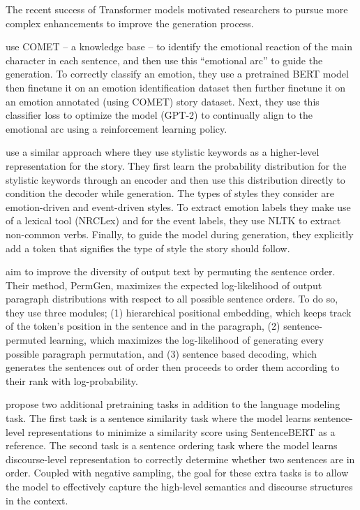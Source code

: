 The recent success of Transformer models motivated researchers to pursue more complex enhancements to improve the generation process.

\citep{brahman2020modeling} use COMET -- a knowledge base -- to identify the emotional reaction of the main character in each sentence, and then use this ``emotional arc'' to guide the generation. To correctly classify an emotion, they use a pretrained BERT model then finetune it on an emotion identification dataset then further finetune it on an emotion annotated (using COMET) story dataset. Next, they use this classifier loss to optimize the model (GPT-2) to continually align to the emotional arc using a reinforcement learning policy.

\citep{kong2021stylized} use a similar approach where they use stylistic keywords as a higher-level representation for the story. They first learn the probability distribution for the stylistic keywords through an encoder and then use this distribution directly to condition the decoder while generation. The types of styles they consider are emotion-driven and event-driven styles. To extract emotion labels they make use of a lexical tool (NRCLex) and for the event labels, they use NLTK to extract non-common verbs. Finally, to guide the model during generation, they explicitly add a token that signifies the type of style the story should follow.

\citep{yu2021sentence} aim to improve the diversity of output text by permuting the sentence order. Their method, PermGen, maximizes the expected log-likelihood of output paragraph distributions with respect to all possible sentence orders. To do so, they use three modules; (1) hierarchical positional embedding, which keeps track of the token's position in the sentence and in the paragraph, (2) sentence-permuted learning, which maximizes the log-likelihood of generating every possible paragraph permutation, and (3) sentence based decoding, which generates the sentences out of order then proceeds to order them according to their rank with log-probability.

\citep{guan2021long} propose two additional pretraining tasks in addition to the language modeling task. The first task is a sentence similarity task where the model learns sentence-level representations to minimize a similarity score using SentenceBERT as a reference. The second task is a sentence ordering task where the model learns discourse-level representation to correctly determine whether two sentences are in order. Coupled with negative sampling, the goal for these extra tasks is to allow the model to effectively capture the high-level semantics and discourse structures in the context.


